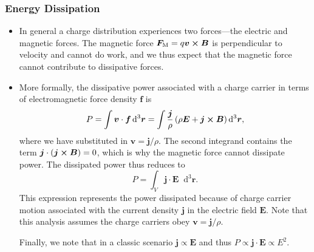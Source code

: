 \documentclass[11pt, a4paper]{article}
\newcommand{\diff}{\mathop{}\!\mathrm{d}} %
\newcommand{\dr}{\diff^{3} \r}  %
\renewcommand{\vec}[1]{\bm{#1}} %
\renewcommand{\r}{\vec{r}}
\newcommand{\E}{\vec{E}} %
\newcommand{\B}{\vec{B}} %
\renewcommand{\j}{\vec{j}}  %
\begin{document}
\subsubsection{Energy Dissipation}
\begin{itemize}
    \item In general a charge distribution experiences two forces---the electric and magnetic forces. The magnetic force $ \vec{F}_{\text{M}} = q \vec{v} \cross \B  $ is perpendicular to velocity and cannot do work, and we thus expect that the magnetic force cannot contribute to dissipative forces. 
	
	\item More formally, the dissipative power associated with a charge carrier in terms of electromagnetic force density $ \vec{f} $ is
	\begin{equation*}
		P = \int \vec{v} \cdot \vec{f} \dr = \int \frac{\j}{\rho} \left(\rho \E + \j \cross \B\right)\dr,
	\end{equation*}
	where we have substituted in $ \vec{v} = \j/\rho $. The second integrand contains the term $ \j \cdot (\j \cross \B) = 0 $, which is why the magnetic force cannot dissipate power. The dissipated power thus reduces to
	\begin{equation*}
		P = \int_{V} \j \cdot \E \dr.
	\end{equation*}
	This expression represents the power dissipated because of charge carrier motion associated with the current density $ \j $ in the electric field $ \E $. Note that this analysis assumes the charge carriers obey $ \vec{v} = \j / \rho $. 
	
    Finally, we note that in a classic scenario $ \j \propto \E $ and thus $ P \propto \j \cdot \E \propto E^{2} $. 
		
\end{itemize}
\end{document}
